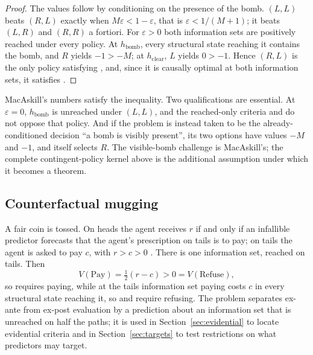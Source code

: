 \begin{proof}
The values follow by conditioning on the presence of the bomb. $(L,L)$ beats $(R,L)$ exactly when
$M\varepsilon<1-\varepsilon$, that is $\varepsilon<1/(M+1)$; it beats $(L,R)$ and $(R,R)$ a fortiori. For
$\varepsilon>0$ both information sets are positively reached under every policy. At
$h_{\mathrm{bomb}}$, every structural state reaching it contains the bomb, and $R$ yields $-1>-M$;
at $h_{\mathrm{clear}}$, $L$ yields $0>-1$. Hence $(R,L)$ is the only policy satisfying ,
and, since it is causally optimal at both information sets, it satisfies .
\end{proof}

MacAskill's numbers satisfy the inequality. Two qualifications are essential. At $\varepsilon=0$,
$h_{\mathrm{bomb}}$ is unreached under $(L,L)$, and the reached-only criteria  and  do
not oppose that policy. And if the problem is instead taken to be the already-conditioned decision
\enquote{a bomb is visibly present}, its two options have values $-M$ and $-1$, and  itself
selects $R$. The visible-bomb challenge is MacAskill's; the complete contingent-policy kernel above
is the additional assumption under which it becomes a theorem.

\subsection{Counterfactual mugging}\label{sec:mugging}

A fair coin is tossed. On heads the agent receives $r$ if and only if an infallible predictor
forecasts that the agent's prescription on tails is to pay; on tails the agent is asked to pay $c$,
with $r>c>0$ \autocite{nesov2009}. There is one information set, reached on tails. Then
\[
  V(\text{Pay})=\tfrac12(r-c)>0=V(\text{Refuse}),
\]
so  requires paying, while at the tails information set paying costs $c$ in every structural
state reaching it, so  and  require refusing. The problem separates ex-ante from
ex-post evaluation by a prediction about an information set that is unreached on half the paths; it
is used in Section~\ref{sec:evidential} to locate evidential criteria and in
Section~\ref{sec:targets} to test restrictions on what predictors may target.
